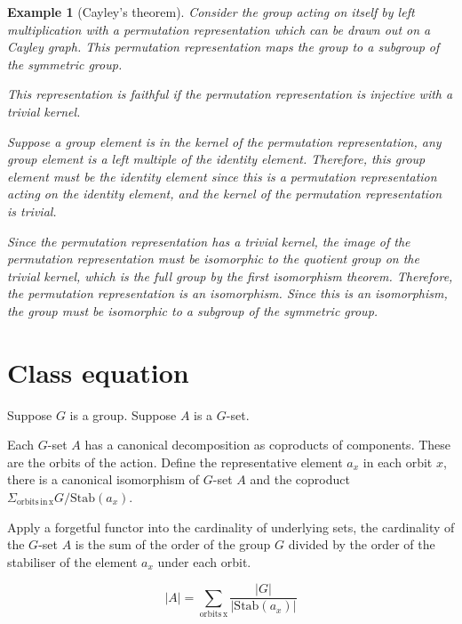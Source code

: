 \documentclass{tufte-book}
\newtheorem{example}[theorem]{Example}
\begin{document}
\begin{example}[Cayley's theorem]
  Consider the group acting on itself by left multiplication with a permutation representation which can be drawn out on a Cayley graph. 
  This permutation representation maps the group to a subgroup of the symmetric group.

  This representation is faithful if the permutation representation is injective with a trivial kernel.
  
  Suppose a group element is in the kernel of the permutation representation, any group element is a left multiple of the identity element. Therefore, this group element must be the identity element since this is a permutation representation acting on the identity element, and the kernel of the permutation representation is trivial.

  Since the permutation representation has a trivial kernel, the image of the permutation representation must be isomorphic to the quotient group on the trivial kernel, which is the full group by the first isomorphism theorem. Therefore, the permutation representation is an isomorphism. Since this is an isomorphism, the group must be isomorphic to a subgroup of the symmetric group. 
\end{example}

\section{Class equation}


Suppose $G$ is a group. Suppose $A$ is a $G$-set.

Each $G$-set $A$ has a canonical decomposition as coproducts of components. These are the orbits of the action. Define the representative element $a_x$ in each orbit $x$, there is a canonical isomorphism of $G$-set $A$ and the coproduct $\Sigma_{\mathrm{orbits \, in \, x}} G / \mathrm{Stab}(a_x)$.

Apply a forgetful functor into the cardinality of underlying sets, the cardinality of the $G$-set $A$ is the sum of the order of the group $G$ divided by the order of the stabiliser of the element $a_x$ under each orbit.

\begin{equation}
  |A| = \sum_{\mathrm{orbits \, x}}
  \dfrac{|G|}{|\mathrm{Stab}(a_x)|}
\end{equation}
\end{document}
